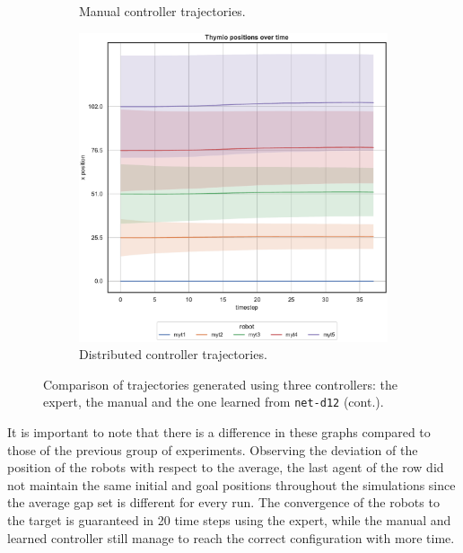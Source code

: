 \begin{figure}[!htb]
\begin{center}
\begin{subfigure}[h]{0.49\textwidth}
			\caption{Manual controller trajectories.}
		\end{subfigure}
		\hfill
		\begin{subfigure}[h]{0.49\textwidth}
			\centering
			\includegraphics[width=.95\textwidth]{contents/images/net-d12/position-overtime-learned_distributed}
			\caption{Distributed controller trajectories.}
		\end{subfigure}
	\end{center}
	\vspace{-0.5cm}
	\caption[Evaluation of the trajectories learned by 
	\texttt{net-d12}.]{Comparison of trajectories generated using three controllers: 
		the expert, the manual and the one learned from \texttt{net-d12} (cont.).}
	\label{fig:net-d12traj}
\end{figure}
It is important to note that there is a difference in these graphs compared to 
those of the previous group of experiments. Observing the deviation of the 
position of the robots with respect to the average, the last agent of the row did 
not maintain the same initial and goal positions throughout the simulations since 
the average gap set is different for every run.
The convergence of the robots to the target is guaranteed in 20 time steps using 
the expert, while the manual and learned controller still manage to reach the 
correct configuration with more time.

